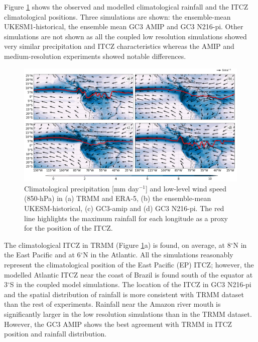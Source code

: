 Figure \ref{fig:3} shows the observed and modelled climatological rainfall and the ITCZ climatological positions. Three simulations are shown: the ensemble-mean UKESM1-historical, the ensemble mean GC3 AMIP and GC3 N216-pi.
Other simulations are not shown as all the coupled low resolution simulations showed very similar precipitation and ITCZ characteristics whereas the AMIP and medium-resolution experiments showed notable differences.

\begin{figure}[t!]
\centering
 \includegraphics[width=\linewidth]{figures/itcz_clim_d.png}
\caption[Climatological precipitation and ITCZ position]{ Climatological precipitation [mm day$^{-1}$] and low-level wind speed (850-hPa) in (a) TRMM and ERA-5, (b) the ensemble-mean UKESM-historical, (c) GC3-amip and (d) GC3 N216-pi. The red line highlights the maximum rainfall for each longitude as a proxy for the position of the ITCZ.  }
\label{fig:3}
\end{figure}

The climatological ITCZ in TRMM (Figure \ref{fig:3}a) is found, on average, at 8$^\circ$N in the East Pacific and at 6$^\circ$N in the Atlantic.
All the simulations reasonably represent the climatological position of the East Pacific (EP) ITCZ; however, the modelled Atlantic ITCZ near the coast of Brazil is found south of the equator at 3$^\circ$S in the coupled model simulations.
The location of the ITCZ in GC3 N216-pi and the spatial distribution of rainfall is more consistent with TRMM dataset than the rest of experiments.
Rainfall near the Amazon river mouth is significantly larger in the low resolution simulations than in the TRMM dataset. 
 However, the GC3 AMIP shows the best agreement with TRMM in ITCZ position and rainfall distribution. 

